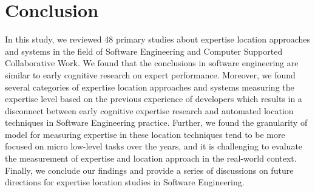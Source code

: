 \chapter{Conclusion}

In this study, we reviewed 48 primary studies about expertise location approaches and systems in the field of Software Engineering and Computer Supported Collaborative Work. We found that the conclusions in software engineering are similar to early cognitive research on expert performance. Moreover, we found several categories of expertise location approaches and systems measuring the expertise level based on the previous experience of developers which results in a disconnect between early cognitive expertise research and automated location techniques in Software Engineering practice. Further, we found the granularity of model for measuring expertise in these location techniques tend to be more focused on micro low-level tasks over the years, and it is challenging to evaluate the measurement of expertise and location approach in the real-world context. Finally, we conclude our findings and provide a series of discussions on future directions for expertise location studies in Software Engineering.